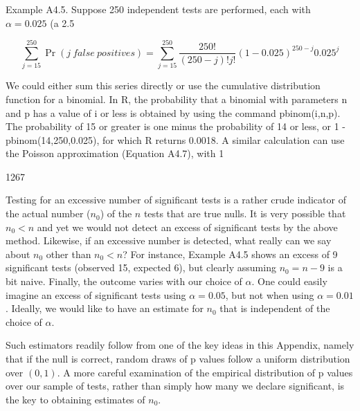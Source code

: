 \documentclass{article}
\begin{document}
Example A4.5. Suppose 250 independent tests are performed, each with  $ \alpha = 0.025 $ (a 2.5%

\begin{equation}
\sum_{j=15}^{250}\Pr(j\ false\ positives)=\sum_{j=15}^{250}\frac{250!}{(250-j)!j!}(1-0.025)^{250-j}0.025^{j}
\end{equation}

We could either sum this series directly or use the cumulative distribution function for a binomial. In R, the probability that a binomial with parameters n and p has a value of i or less is obtained by using the command pbinom(i,n,p). The probability of 15 or greater is one minus the probability of 14 or less, or 1 - pbinom(14,250,0.025), for which R returns 0.0018. A similar calculation can use the Poisson approximation (Equation A4.7), with 1

1267

Testing for an excessive number of significant tests is a rather crude indicator of the actual number ($n_0$) of the $n$ tests that are true nulls. It is very possible that $n_0 < n$ and yet we would not detect an excess of significant tests by the above method. Likewise, if an excessive number is detected, what really can we say about $n_0$ other than $n_0 < n$? For instance, Example A4.5 shows an excess of 9 significant tests (observed 15, expected 6), but clearly assuming $n_0 = n - 9$ is a bit naive. Finally, the outcome varies with our choice of $\alpha$. One could easily imagine an excess of significant tests using $\alpha = 0.05$, but not when using $\alpha = 0.01$. Ideally, we would like to have an estimate for $n_0$ that is independent of the choice of $\alpha$.

Such estimators readily follow from one of the key ideas in this Appendix, namely that if the null is correct, random draws of p values follow a uniform distribution over  $ (0,1) $. A more careful examination of the empirical distribution of p values over our sample of tests, rather than simply how many we declare significant, is the key to obtaining estimates of  $ n_{0} $.
\end{document}
